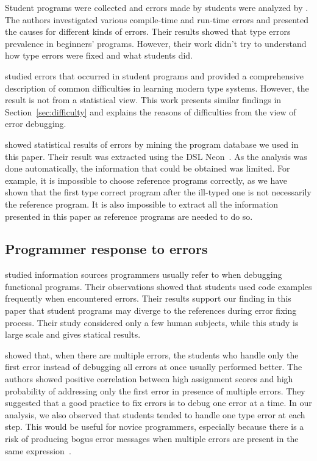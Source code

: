 \documentclass[12pt]{report}	%
\begin{document}
Student programs were collected and errors made by students
were analyzed by \cite{tirronen2015understanding}.
The authors investigated various compile-time and run-time errors
and presented the causes for different kinds of errors.
Their results showed that type errors prevalence in beginners' programs.
However, their work didn't try to understand how type
errors were fixed and what students did.

\cite{tirronen2014study} studied
errors that occurred in student programs and
provided a comprehensive description of
common difficulties in learning modern type systems.
However, the result is not from a statistical view.
This work presents similar findings in Section~\ref{sec:difficulty}
and explains the
reasons of difficulties from the view of error debugging.

\cite{hage2006mining} showed statistical
results of errors by mining the program database we used
in this paper.
Their result was extracted using the DSL Neon~\cite{Hage09:Neon}.
As the analysis was done automatically, the information that
could be obtained was limited. For example, it is impossible
to choose reference programs correctly, as we have shown that
the first type correct program after the ill-typed one is not
necessarily the reference program. It is also impossible to
extract all the information presented in this paper as
reference programs are needed to do so.

\subsection{Programmer response to errors}

\cite{chambers2012function} studied information sources programmers
usually refer to when debugging functional
programs.
Their observations showed that students used
code examples frequently
when encountered errors.
Their results support our finding in this paper that
student programs may diverge to the references
during error fixing process. Their study
considered only a few human subjects, while this study is
large scale and gives statical results.

\cite{munson2016analyzing}
showed that, when there are multiple errors,
the students who handle only the first error
instead of debugging all errors at once usually
performed better.
The authors showed positive correlation
between high assignment scores and
high probability of addressing only
the first error in presence of multiple errors.
%
They suggested that a good practice to fix
errors is to debug one error at a time.
In our analysis, we also observed that
students tended to handle one type error at each step.
This would be useful for novice programmers, especially
because there is a risk of producing bogus error messages
when multiple errors are present in
the same expression~\cite{Heeren05:TQT}.
\end{document}
